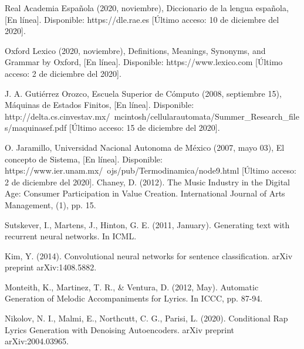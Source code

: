 \documentclass[12pt, a4paper, titlepage]{report}
\begin{document}
\begin{thebibliography}{20}
	Real Academia Española (2020, noviembre), Diccionario de la lengua española, [En línea]. Disponible: https://dle.rae.es [Último acceso: 10 de diciembre del 2020].
	
	Oxford Lexico (2020, noviembre), Definitions, Meanings, Synonyms, and Grammar by Oxford, [En línea]. Disponible: https://www.lexico.com [Último acceso: 2 de diciembre del 2020].
	
	J. A. Gutiérrez Orozco, Escuela Superior de Cómputo (2008, septiembre 15), Máquinas de Estados Finitos, [En línea]. Disponible: http://delta.cs.cinvestav.mx/~mcintosh/cellularautomata/Summer\_Research\_files/maquinasef.pdf [Último acceso: 15 de diciembre del 2020].
	
	O. Jaramillo, Universidad Nacional Autonoma de México (2007, mayo 03), El concepto de Sistema, [En línea]. Disponible: https://www.ier.unam.mx/~ojs/pub/Termodinamica/node9.html [Último acceso: 2 de diciembre del 2020].
	Chaney, D. (2012). The Music Industry in the Digital Age: Consumer Participation in Value Creation. International Journal of Arts Management, (1), pp. 15.
	
	Sutskever, I., Martens, J., Hinton, G. E. (2011, January). Generating text with recurrent neural networks. In ICML.
	
	Kim, Y. (2014). Convolutional neural networks for sentence classification. arXiv preprint arXiv:1408.5882.
	
	Monteith, K., Martinez, T. R., \& Ventura, D. (2012, May). Automatic Generation of Melodic Accompaniments for Lyrics. In ICCC, pp. 87-94.
	
	Nikolov, N. I., Malmi, E., Northcutt, C. G., Parisi, L. (2020). Conditional Rap Lyrics Generation with Denoising Autoencoders. arXiv preprint arXiv:2004.03965.
	

\end{thebibliography}
\end{document}
